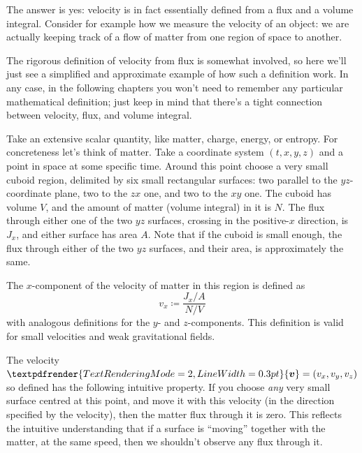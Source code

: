 \documentclass[a4paper,12pt,%
onecolumn,oneside,titlepage,%
british%
]{memoir}
\renewcommand*{\bm}[1]{\textpdfrender{TextRenderingMode=2,LineWidth=0.3pt}{\boldsymbol{#1}}}
\newcommand*{\defd}{\coloneqq}
\renewcommand*{\|}[1][]{\nonscript\:#1\vert\nonscript\:\mathopen{}}
\newcommand*{\yv}{\bm{v}}
\newcommand*{\yN}{N}
\newcommand*{\yJ}{J}
\begin{document}
The answer is yes: velocity is in fact essentially defined from a flux and a volume integral. Consider for example how we measure the velocity of an object: we are actually keeping track of a flow of matter from one region of space to another.

The rigorous definition of velocity from flux is somewhat involved, so here we'll just see a simplified and approximate example of how such a definition work. In any case, in the following chapters you won't need to remember any particular mathematical definition; just keep in mind that there's a tight connection between velocity, flux, and volume integral.

Take an extensive scalar quantity, like matter, charge, energy, or entropy. For concreteness let's think of matter. Take a coordinate system $(t,x,y,z)$ and a point in space at some specific time. Around this point choose a very small cuboid region, delimited by six small rectangular surfaces: two parallel to the $yz$-coordinate plane, two to the $zx$ one, and two to the $xy$ one. The cuboid has volume $V$, and the amount of matter (volume integral) in it is $\yN$. The flux through either one of the two $yz$ surfaces, crossing in the positive-$x$ direction, is $\yJ_{x}$, and either surface has area $A$. Note that if the cuboid is small enough, the flux through either of the two $yz$ surfaces, and their area, is approximately the same.

The $x$-component of the velocity of matter in this region is defined as
\begin{equation}
  \label{eq:velocity_from_flux}
  v_{x} \defd \frac{\yJ_{x}/A}{\yN/V}
\end{equation}
with analogous definitions for the $y$- and $z$-components.
This definition is valid for small velocities and weak gravitational fields.


The velocity $\yv=(v_{x}, v_{y}, v_{z})$ so defined has the following intuitive property. If you choose \emph{any} very small surface centred at this point, and move it with this velocity (in the direction specified by the velocity), then the matter flux through it is zero. This reflects the intuitive understanding that if a surface is \enquote{moving} together with the matter, at the same speed, then we shouldn't observe any flux through it.
\end{document}
